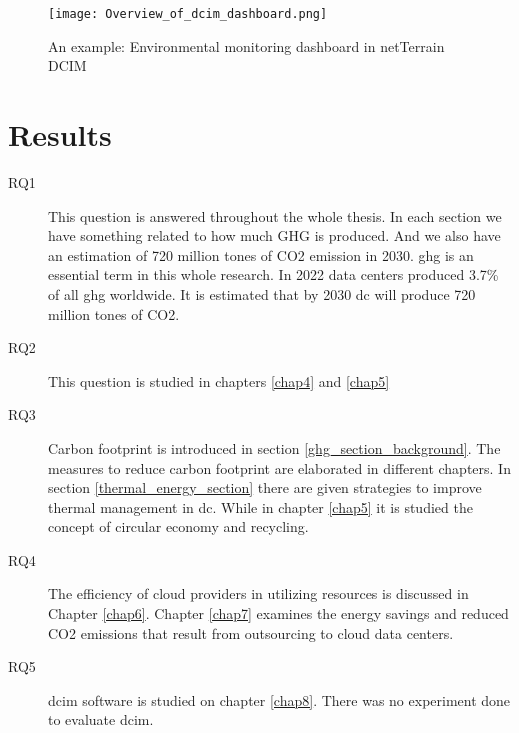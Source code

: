\documentclass[
  a4paper,  %
  twoside,  %
  bibliography=totoc,
  headsepline,
  cleardoublepage=empty,
  parskip=half,
  draft=false
]{scrbook}
\begin{document}
\begin{figure}
	\centering
	\texttt{[image: Overview\_of\_dcim\_dashboard.png]}
	\caption{An example: Environmental monitoring dashboard in netTerrain DCIM\cite{graphicalnetworksLoweringYour}}
	\label{dcim_dashboard}
\end{figure}


\chapter{Results}

\begin{description}
	\item[RQ1]
	
	This question is answered throughout the whole thesis. In each section we have something related to how much GHG is produced. And we also have an estimation of 720 million tones of CO2 emission in 2030.
	\gls{ghg} is an essential term in this whole research. In 2022 data centers produced 3.7\% of all \gls{ghg} worldwide. It is estimated that by 2030 \gls{dc} will produce 720 million tones of CO2.
	
	\item[RQ2]
	
	This question is studied in chapters \ref{chap4} and \ref{chap5}
	
	\item[RQ3] 
	
	Carbon footprint is introduced in section \ref{ghg_section_background}. The measures to reduce carbon footprint are elaborated in different chapters. In section \ref{thermal_energy_section} there are given strategies to improve thermal management in \gls{dc}. While in chapter \ref{chap5} it is studied the concept of circular economy and recycling.
	
	\item[RQ4] 
	
	The efficiency of cloud providers in utilizing resources is discussed in Chapter \ref{chap6}. Chapter \ref{chap7} examines the energy savings and reduced CO2 emissions that result from outsourcing to cloud data centers.
	
	\item[RQ5] 
	
	\gls{dcim} software is studied on chapter \ref{chap8}. There was no experiment done to evaluate \gls{dcim}.
	
\end{description}
\end{document}
